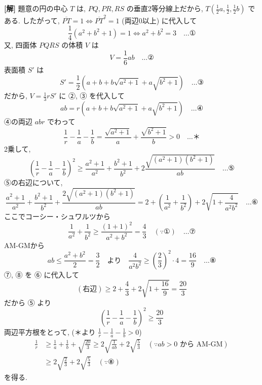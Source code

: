 \documentclass[../main.tex]{subfiles}
\begin{document}
\noindent
\textbf{[解]} 題意の円の中心 $T$ は, $PQ, PR, RS$ の垂直2等分線上だから, $T\left(\frac{1}{2}a, \frac{1}{2}, \frac{1}{2}b\right)$ である. したがって, $\overline{PT} = 1 \iff \overline{PT}^2 = 1$ (両辺0以上) に代入して
\[
  \frac{1}{4}(a^2 + b^2 + 1) = 1 \iff a^2 + b^2 = 3 \quad \dots \text{①}
\]
又, 四面体 $PQRS$ の体積 $V$ は
\[
  V = \frac{1}{6} ab \quad \dots \text{②}
\]
表面積 $S'$ は
\[
  S' = \frac{1}{2}\left(a + b + b\sqrt{a^2+1} + a\sqrt{b^2+1}\right) \quad \dots \text{③}
\]
だから, $V = \frac{1}{3} r S'$ に ②, ③ を代入して
\[
  ab = r\left(a + b + b\sqrt{a^2+1} + a\sqrt{b^2+1}\right) \quad \dots \text{④}
\]
④の両辺 $ab r$ でわって
\[
  \frac{1}{r} - \frac{1}{a} - \frac{1}{b} = \frac{\sqrt{a^2+1}}{a} + \frac{\sqrt{b^2+1}}{b} > 0 \quad \dots \text{＊}
\]
2乗して,
\[
  \left(\frac{1}{r} - \frac{1}{a} - \frac{1}{b}\right)^2 \ge \frac{a^2+1}{a^2} + \frac{b^2+1}{b^2} + 2 \frac{\sqrt{(a^2+1)(b^2+1)}}{ab} \quad \dots \text{⑤}
\]
⑤の右辺について,
\[
  \frac{a^2+1}{a^2} + \frac{b^2+1}{b^2} + \frac{2\sqrt{(a^2+1)(b^2+1)}}{ab} = 2 + \left(\frac{1}{a^2} + \frac{1}{b^2}\right) + 2\sqrt{1 + \frac{4}{a^2 b^2}} \quad \dots \text{⑥}
\]
ここでコーシー・シュワルツから
\[
  \frac{1}{a^2} + \frac{1}{b^2} \ge \frac{(1+1)^2}{a^2+b^2} = \frac{4}{3} \quad (\because \text{①}) \quad \dots \text{⑦}
\]
AM-GMから
\[
  ab \le \frac{a^2+b^2}{2} = \frac{3}{2} \quad \text{より} \quad \frac{4}{a^2 b^2} \ge \left(\frac{2}{3}\right)^2 \cdot 4 = \frac{16}{9} \quad \dots \text{⑧}
\]
⑦, ⑧ を ⑥ に代入して
\[
  (\text{右辺}) \ge 2 + \frac{4}{3} + 2\sqrt{1 + \frac{16}{9}} = \frac{20}{3}
\]
だから ⑤ より
\[
  \left(\frac{1}{r} - \frac{1}{a} - \frac{1}{b}\right)^2 \ge \frac{20}{3}
\]
両辺平方根をとって, (＊より $\frac{1}{r} - \frac{1}{a} - \frac{1}{b} > 0$)
\begin{align*}
  \frac{1}{r} &\ge \frac{1}{a} + \frac{1}{b} + \sqrt{\frac{20}{3}} \ge 2\sqrt{\frac{1}{ab}} + 2\sqrt{\frac{5}{3}} \quad (\because ab > 0 \text{ から AM-GM}) \\
  &\ge 2\sqrt{\frac{2}{3}} + 2\sqrt{\frac{5}{3}} \quad (\because \text{⑧})
\end{align*}
を得る.

\begin{center}
\end{center}
\end{document}
